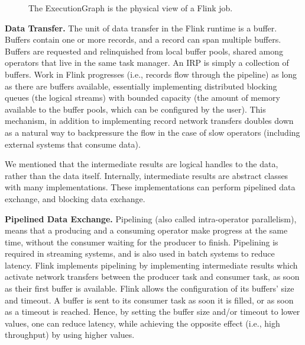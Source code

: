 \documentclass{sig-alternate}
\begin{document}
\begin{figure}[ht]
\label{fig:ExecutionGraph}
\caption{The ExecutionGraph is the physical view of a Flink job.}
\end{figure}

\textbf{Data Transfer.} The unit of data transfer in the Flink runtime is a buffer. Buffers contain one or more records, and a record can span multiple buffers. Buffers are requested and relinquished from local buffer pools, shared among operators that live in the same task manager. An IRP is simply a collection of buffers. Work in Flink progresses (i.e., records flow through the pipeline) as long as there are buffers available, essentially implementing distributed blocking queues (the logical streams) with bounded capacity (the amount of memory available to the buffer pools, which can be configured by the user). This mechanism, in addition to implementing record network transfers doubles down as a natural way to backpressure the flow in the case of slow operators (including external systems that consume data). 

We mentioned that the intermediate results are logical handles to the data, rather than the data itself. Internally, intermediate results are abstract classes with many implementations. These implementations can perform pipelined data exchange, and blocking data exchange.

\textbf{Pipelined Data Exchange.} Pipelining (also called intra-operator parallelism), means that a producing and a consuming operator make progress at the same time, without the consumer waiting for the producer to finish. Pipelining is required in streaming systems, and is also used in batch systems to reduce latency. Flink implements pipelining by implementing intermediate results which activate network transfers between the producer task and consumer task,  as soon as their first buffer is available. Flink allows the configuration of its buffers' size and timeout. A buffer is sent to its consumer task as soon it is filled,  or as soon as a timeout is reached. Hence, by setting the buffer size and/or timeout to lower values, one can reduce latency, while achieving the opposite effect (i.e., high throughput) by using higher values.
\end{document}
